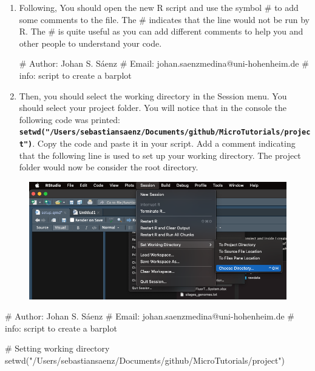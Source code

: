 \documentclass[
  letterpaper,
  DIV=11,
  numbers=noendperiod]{scrartcl}
\newenvironment{Shaded}{\begin{snugshade}}{\end{snugshade}}
\newcommand{\CommentTok}[1]{\textcolor[rgb]{0.37,0.37,0.37}{#1}}
\newcommand{\FunctionTok}[1]{\textcolor[rgb]{0.28,0.35,0.67}{#1}}
\newcommand{\NormalTok}[1]{\textcolor[rgb]{0.00,0.23,0.31}{#1}}
\newcommand{\StringTok}[1]{\textcolor[rgb]{0.13,0.47,0.30}{#1}}
\begin{document}
\begin{enumerate}
\def\labelenumi{\arabic{enumi}.}
\setcounter{enumi}{3}
\item
  Following, You should open the new R script and use the symbol \# to
  add some comments to the file. The \# indicates that the line would
  not be run by R. The \# is quite useful as you can add different
  comments to help you and other people to understand your code.

\begin{Shaded}
\begin{Highlighting}[]
\CommentTok{\# Author: Johan S. Sáenz}
\CommentTok{\# Email: johan.saenzmedina@uni{-}hohenheim.de}
\CommentTok{\# info: script to create a barplot}
\end{Highlighting}
\end{Shaded}
\item
  Then, you should select the working directory in the Session menu. You
  should select your project folder. You will notice that in the console
  the following code was printed:
  \textbf{\texttt{setwd("/Users/sebastiansaenz/Documents/github/MicroTutorials/project")}}.
  Copy the code and paste it in your script. Add a comment indicating
  that the following line is used to set up your working directory. The
  project folder would now be consider the root directory.
\end{enumerate}

\begin{figure}[H]

{\centering \includegraphics[width=6.25in,height=\textheight]{wd.png}

}

\end{figure}

\begin{Shaded}
\begin{Highlighting}[]
\CommentTok{\# Author: Johan S. Sáenz}
\CommentTok{\# Email: johan.saenzmedina@uni{-}hohenheim.de}
\CommentTok{\# info: script to create a barplot}

\CommentTok{\# Setting working directory}
\FunctionTok{setwd}\NormalTok{(}\StringTok{"/Users/sebastiansaenz/Documents/github/MicroTutorials/project"}\NormalTok{)}
\end{Highlighting}
\end{Shaded}
\end{document}
